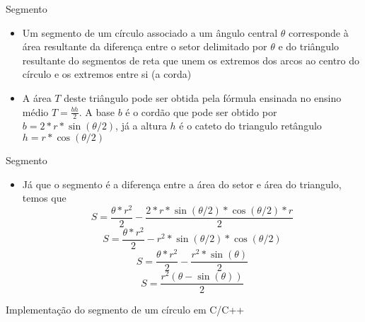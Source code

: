 \begin{frame}[fragile]{Segmento}

    \begin{itemize}
        \item Um segmento de um círculo associado a um ângulo central $\theta$ corresponde à área 
            resultante da diferença entre o setor delimitado por $\theta$ e do triângulo 
            resultante do segmentos de reta que unem os extremos dos arcos ao centro do círculo e 
            os extremos entre si (a corda)

        \item A área $T$ deste triângulo pode ser obtida pela fórmula ensinada no ensino médio
            $T = \frac{bh}{2}$. A base $b$ é o cordão que pode ser obtido por
            $b = 2*r*\sin(\theta/2)$, já a altura $h$ é o cateto do triangulo retângulo
            $h = r*\cos(\theta/2)$

        \begin{figure}
            \centering
        \end{figure}
 
    \end{itemize}

\end{frame}

\begin{frame}[fragile]{Segmento}

    \begin{itemize}
        \item Já que o segmento é a diferença entre a área do setor e área do triangulo, temos que
        \[
            S = \frac{\theta*r^2}{2} - \frac{2*r*\sin(\theta/2)*\cos(\theta/2)*r}{2}
        \]
        \[
            S = \frac{\theta*r^2}{2} - r^2*\sin(\theta/2)*\cos(\theta/2)
        \]
        \[
            S = \frac{\theta*r^2}{2} - \frac{r^2*\sin(\theta)}{2}
        \]
        \[
            S = \frac{r^2(\theta - \sin(\theta))}{2}
        \]
 
    \end{itemize}

\end{frame}

\begin{frame}[fragile]{Implementação do segmento de um círculo em C/C++}
\end{frame}
